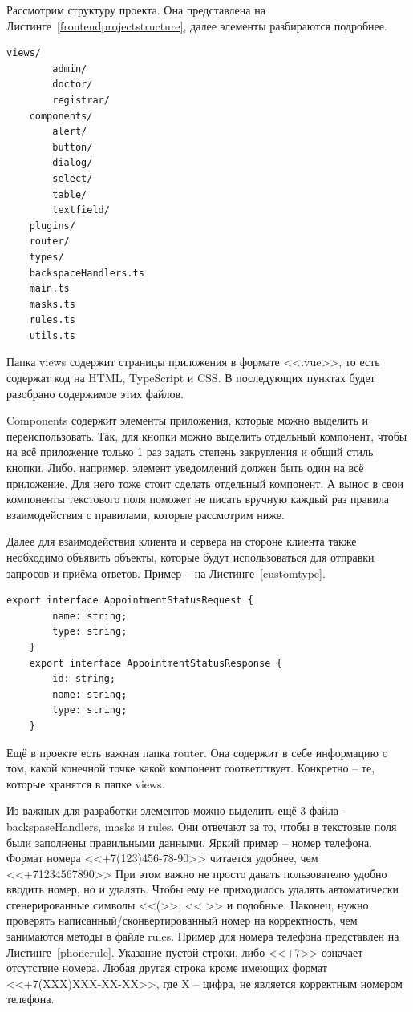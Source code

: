 \documentclass[a4paper,article]{article}
\begin{document}
\begin{sloppypar}
    Рассмотрим структуру проекта. Она представлена на Листинге~\ref{frontendprojectstructure},  далее элементы разбираются подробнее.

    \begin{lstlisting}[label=frontendprojectstructure,caption=Структура клиентского приложения]
    views/
        admin/
        doctor/
        registrar/
    components/
        alert/
        button/
        dialog/
        select/
        table/
        textfield/
    plugins/
    router/
    types/
    backspaceHandlers.ts
    main.ts
    masks.ts
    rules.ts
    utils.ts
    \end{lstlisting}

    Папка views содержит страницы приложения в формате <<.vue>>, то есть содержат код на HTML, TypeScript и CSS. В последующих пунктах будет разобрано содержимое этих файлов.

    Components содержит элементы приложения, которые можно выделить и переиспользовать. Так, для кнопки можно выделить отдельный компонент, чтобы на всё приложение только 1 раз задать степень закругления и общий стиль кнопки. Либо, например, элемент уведомлений должен быть один на всё приложение. Для него тоже стоит сделать отдельный компонент. А вынос в свои компоненты текстового поля поможет не писать вручную каждый раз правила взаимодействия с правилами, которые рассмотрим ниже.

    Далее для взаимодействия клиента и сервера на стороне клиента также необходимо объявить объекты, которые будут использоваться для отправки запросов и приёма ответов. Пример -- на Листинге~\ref{customtype}.

    \begin{lstlisting}[label=customtype,caption=Пример объявленных типов для обмена сообщениями с сервером]
    export interface AppointmentStatusRequest {
        name: string;
        type: string;
    }
    export interface AppointmentStatusResponse {
        id: string;
        name: string;
        type: string;
    }
    \end{lstlisting}

    Ещё в проекте есть важная папка router. Она содержит в себе информацию о том, какой конечной точке какой компонент соответствует. Конкретно -- те, которые хранятся в папке views.

    Из важных для разработки элементов можно выделить ещё 3 файла - backspaseHandlers, masks и rules. Они отвечают за то, чтобы в текстовые поля были заполнены правильными данными. Яркий пример -- номер телефона. Формат номера <<+7(123)456-78-90>> читается удобнее, чем <<+71234567890>> При этом важно не просто давать пользователю удобно вводить номер, но и удалять. Чтобы ему не приходилось удалять автоматически сгенерированные символы <<(>>, <<.>> и подобные. Наконец, нужно проверять написанный/сконвертированный номер на корректность, чем занимаются методы в файле rules. Пример для номера телефона представлен на Листинге~\ref{phonerule}. Указание пустой строки, либо <<+7>> означает отсутствие номера. Любая другая строка кроме имеющих формат <<+7(XXX)XXX-XX-XX>>, где X -- цифра, не является корректным номером телефона.


\end{sloppypar}
\end{document}
